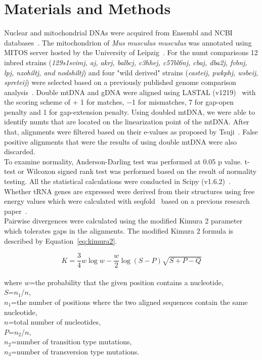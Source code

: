\documentclass[a4paper,12pt]{article}
\numberwithin{equation}{section} %
\begin{document}
\section{Materials and Methods}
\indent Nuclear and mitochondrial DNAs were acquired from Ensembl and NCBI databases~. The mitochondrion of \textit{Mus musculus musculus} was annotated using MITOS server hosted by the University of Leipzig~. For the numt comparisons 12 inbred strains (\textit{129s1svimj, aj, akrj, balbcj, c3hhej, c57bl6nj, cbaj, dba2j, fvbnj, lpj, nzohiltj, and nodshiltj}) and four "wild derived" strains (\textit{casteij, pwkphj, wsbeij, spreteij}) were selected based on a previously published genome comparison analysis~. Double mtDNA and gDNA were aligned using LASTAL (v1219)~ with the scoring scheme of + 1 for matches, −1 for mismatches, 7 for gap-open penalty and 1 for gap-extension penalty. Using doubled mtDNA, we were able to identify numts that are located on the linearization point of the mtDNA. After that, alignments were filtered based on their e-values as proposed by Tsuji~.  False positive alignments that were the results of using double mtDNA were also discarded.\\ \indent To examine normality, Anderson-Darling test was performed at 0.05 p value. t-test or Wilcoxon signed rank test was performed based on the result of normality testing. All the statistical calculations were conducted in Scipy (v1.6.2)~. Whether tRNA genes are expressed were derived from their structures using free energy values which were calculated with seqfold~ based on a previous research paper~. \\ Pairwise divergences were calculated using the modified Kimura 2 parameter~ which tolerates gaps in the alignments. The modified Kimura 2 formula is described by Equation~\ref{eq:kimura2}.

\begin{equation}\label{eq:kimura2}
	K=\frac{3}{4}w\log w- \frac{w}{2} \log (S-P) \sqrt{S+P-Q}
\end{equation}\\
where $w$=the probability that the given position contains a nucleotide,\\
$S$=$n_1$/$n$,\\
$n_1$=the number of positions where the two aligned sequences contain the same nucleotide,\\
$n$=total number of nucleotides,\\
$P$=$n_2$/$n$,\\
$n_2$=number of transition type mutations,\\
$n_3$=number of transversion type mutations.\\
\end{document}
